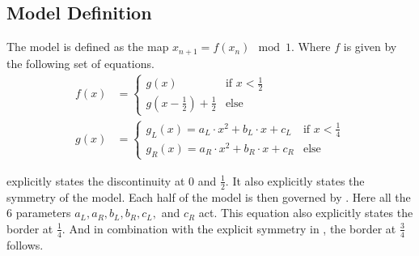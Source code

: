 \subsection{Model Definition}
\label{sec:setup.quad.def}

The model is defined as the map $x_{n+1} = f(x_n) \mod 1$.
Where $f$ is given by the following set of equations.
\begin{align}
	f(x) & = \begin{cases}
		         g(x)                             & \text{if } x < \frac{1}{2} \\
		         g(x - \frac{1}{2}) + \frac{1}{2} & \text{else}
	         \end{cases} \label{equ:quad.f}           \\
	g(x) & = \begin{cases}
		         g_L(x) = a_L \cdot x^2 + b_L \cdot x + c_L & \text{if } x < \frac{1}{4} \\
		         g_R(x) = a_R \cdot x^2 + b_R \cdot x + c_R & \text{else}
	         \end{cases} \label{equ:quad.g}
\end{align}

 explicitly states the discontinuity at $0$ and $\frac{1}{2}$.
It also explicitly states the symmetry of the model.
Each half of the model is then governed by .
Here all the 6 parameters $a_L, a_R, b_L, b_R, c_L,$ and $c_R$ act.
This equation also explicitly states the border at $\frac{1}{4}$.
And in combination with the explicit symmetry in , the border at $\frac{3}{4}$ follows.
